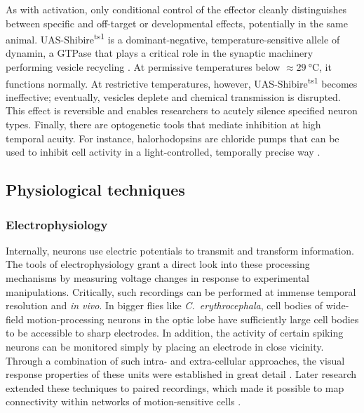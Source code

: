 As with activation, only conditional control of the effector cleanly distinguishes between specific and off-target or developmental effects, potentially in the same animal. UAS-Shibire\textsuperscript{ts1} is a dominant-negative, temperature-sensitive allele of dynamin, a GTPase that plays a critical role in the synaptic machinery performing vesicle recycling \citep{Kitamoto:2001ue,Pfeiffer:2012bu}. At permissive temperatures below $\approx \SI{29}{\celsius}$, it functions normally. At restrictive temperatures, however, UAS-Shibire\textsuperscript{ts1} becomes ineffective; eventually, vesicles deplete and chemical transmission is disrupted. This effect is reversible and enables researchers to acutely silence specified neuron types. Finally, there are optogenetic tools that mediate inhibition at high temporal acuity. For instance, halorhodopsins are chloride pumps that can be used to inhibit cell activity in a light-controlled, temporally precise way \citep{Gradinaru:2008aa}.

\subsection{Physiological techniques}

\subsubsection{Electrophysiology} Internally, neurons use electric potentials to transmit and transform information. The tools of electrophysiology grant a direct look into these processing mechanisms by measuring voltage changes in response to experimental manipulations. Critically, such recordings can be performed at immense temporal resolution and \textit{in vivo}. In bigger flies like \textit{C.\ erythrocephala}, cell bodies of wide-field motion-processing neurons in the optic lobe have sufficiently large cell bodies to be accessible to sharp electrodes. In addition, the activity of certain spiking neurons can be monitored simply by placing an electrode in close vicinity. Through a combination of such intra- and extra-cellular approaches, the visual response properties of these units were established in great detail \citep{Bishop:1967aa,Hausen:1976aa,Eckert:1980aa,Hausen:1982aa,Hausen:1982bb,Hengstenberg:1982aa}. Later research extended these techniques to paired recordings, which made it possible to map connectivity within networks of motion-sensitive cells \citep{Haag:2004ho}.

